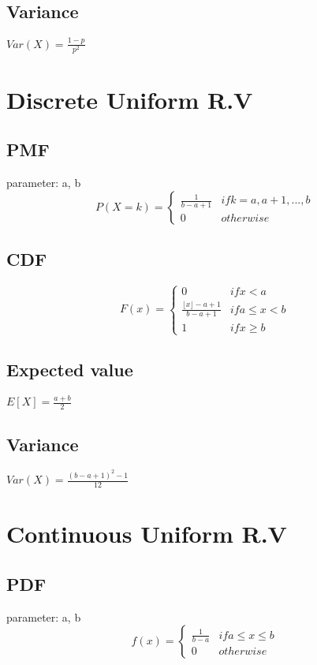     \subsection*{Variance}
        $Var(X)=\frac{1-p}{p^2}$

\section{Discrete Uniform R.V}
    \subsection*{PMF}
        parameter: a, b
        \begin{equation*}
            P(X=k)=
            \begin{cases}
                \frac{1}{b-a+1} & if k = a, a+1, ..., b \\
                0 & otherwise
            \end{cases}
        \end{equation*}

    \subsection*{CDF}
        \begin{equation*}
            F(x)=
            \begin{cases}
                0 & if x < a \\
                \frac{\lfloor x \rfloor - a + 1}{b-a+1} & if a \leq x < b \\
                1 & if x \geq b
            \end{cases}
        \end{equation*}

    \subsection*{Expected value}
        $E[X] = \frac{a+b}{2}$

    \subsection*{Variance}
        $Var(X)=\frac{(b-a+1)^2-1}{12}$

\section{Continuous Uniform R.V}
    \subsection*{PDF}
        parameter: a, b
        \begin{equation*}
            f(x)=
            \begin{cases}
                \frac{1}{b-a} & if a \leq x \leq b \\
                0 & otherwise
            \end{cases}
        \end{equation*}

